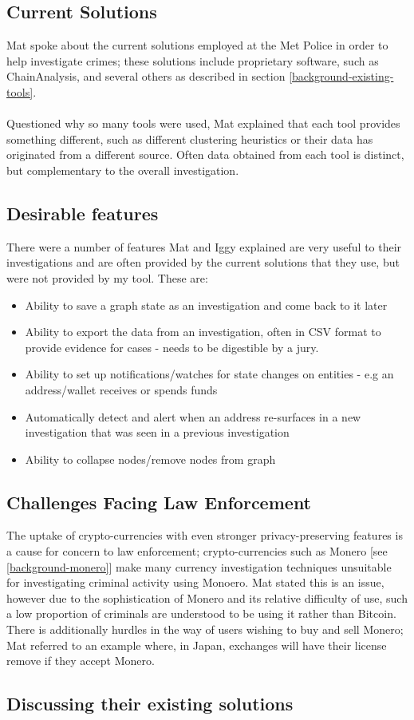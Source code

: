 \subsection{Current Solutions}
Mat spoke about the current solutions employed at the Met Police in order to help investigate crimes; these solutions include proprietary software, such as ChainAnalysis, and several others as described in section \ref{background-existing-tools}. 
\\\\
Questioned why so many tools were used, Mat explained that each tool provides something different, such as different clustering heuristics or their data has originated from a different source. Often data obtained from each tool is distinct, but complementary to the overall investigation.  

\subsection{Desirable features}
There were a number of features Mat and Iggy explained are very useful to their investigations and are often provided by the current solutions that they use, but were not provided by my tool. These are:
\begin{itemize}
    \item Ability to save a graph state as an investigation and come back to it later
    \item Ability to export the data from an investigation, often in CSV format to provide evidence for cases - needs to be digestible by a jury.
    \item Ability to set up notifications/watches for state changes on entities - e.g an address/wallet receives or spends funds 
    \item Automatically detect and alert when an address re-surfaces in a new investigation that was seen in a previous investigation 
    \item Ability to collapse nodes/remove nodes from graph 
    
\end{itemize}

\subsection{Challenges Facing Law Enforcement}
The uptake of crypto-currencies with even stronger privacy-preserving features is a cause for concern to law enforcement; crypto-currencies such as Monero [see \ref{background-monero}] make many currency investigation techniques unsuitable for investigating criminal activity using Monoero. Mat stated this is an issue, however due to the sophistication of Monero and its relative difficulty of use, such a low proportion of criminals are understood to be using it rather than Bitcoin. There is additionally hurdles in the way of users wishing to buy and sell Monero; Mat referred to an example where, in Japan, exchanges will have their license remove if they accept Monero.


\subsection{Discussing their existing solutions}
